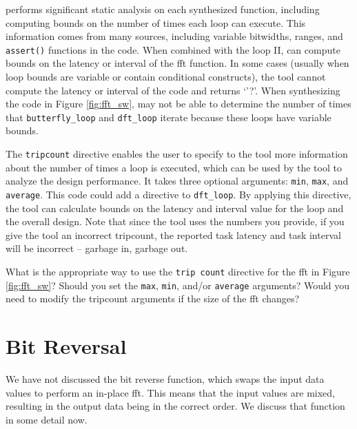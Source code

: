 \begin{aside}
\VHLS performs significant static analysis on each synthesized function, including computing bounds on the number of times each loop can execute.  This information comes from many sources, including variable bitwidths, ranges, and \lstinline|assert()| functions in the code. When combined with the loop II, \VHLS can compute bounds on the latency or interval of the \gls{fft} function.  In some cases (usually when loop bounds are variable or contain conditional constructs), the tool cannot compute the latency or interval of the code and returns `'?'.  When synthesizing the code in Figure \ref{fig:fft_sw}, \VHLS may not be able to determine the number of times that \lstinline|butterfly_loop| and \lstinline|dft_loop| iterate because these loops have variable bounds.

The \lstinline|tripcount| directive enables the user to specify to the \VHLS tool more information about the number of times a loop is executed, which can be used by the tool to analyze the design performance. It takes three optional arguments: \lstinline|min|, \lstinline|max|, and \lstinline|average|. This code could add a directive to \lstinline|dft_loop|. By applying this directive, the \VHLS tool can calculate bounds on the latency and interval value for the loop and the overall design.  Note that since the \VHLS tool uses the numbers you provide, if you give the tool an incorrect tripcount, the reported task latency and task interval will be incorrect -- garbage in, garbage out.   
\end{aside}

\begin{exercise}
What is the appropriate way to use the \lstinline|trip count| directive for the \gls{fft} in Figure \ref{fig:fft_sw}? Should you set the \lstinline|max|, \lstinline|min|, and/or \lstinline|average| arguments? Would you need to modify the tripcount arguments if the size of the \gls{fft} changes?  
\end{exercise}

\section{Bit Reversal}
\label{sec:fft_bit_reversal}

We have not discussed the bit reverse function, which swaps the input data values to perform an in-place \gls{fft}. This means that the input values are mixed, resulting in the output data being in the correct order. We discuss that function in some detail now.


